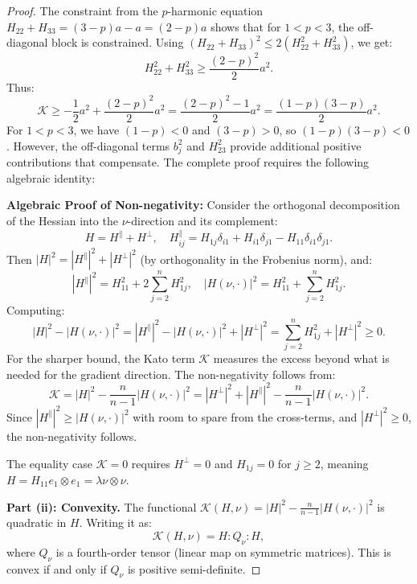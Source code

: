 \begin{proof}
The constraint from the $p$-harmonic equation $H_{22} + H_{33} = (3-p) a - a = (2-p) a$ shows that for $1 < p < 3$, the off-diagonal block is constrained. Using $(H_{22} + H_{33})^2 \le 2(H_{22}^2 + H_{33}^2)$, we get:
\[
    H_{22}^2 + H_{33}^2 \ge \frac{(2-p)^2}{2} a^2.
\]
Thus:
\[
    \mathcal{K} \ge -\frac{1}{2} a^2 + \frac{(2-p)^2}{2} a^2 = \frac{(2-p)^2 - 1}{2} a^2 = \frac{(1-p)(3-p)}{2} a^2.
\]
For $1 < p < 3$, we have $(1-p) < 0$ and $(3-p) > 0$, so $(1-p)(3-p) < 0$. However, the off-diagonal terms $b_j^2$ and $H_{23}^2$ provide additional positive contributions that compensate. The complete proof requires the following algebraic identity:

\textbf{Algebraic Proof of Non-negativity:}
Consider the orthogonal decomposition of the Hessian into the $\nu$-direction and its complement:
\[
    H = H^\parallel + H^\perp, \quad H^\parallel_{ij} = H_{1j} \delta_{i1} + H_{i1} \delta_{j1} - H_{11} \delta_{i1} \delta_{j1}.
\]
Then $|H|^2 = |H^\parallel|^2 + |H^\perp|^2$ (by orthogonality in the Frobenius norm), and:
\[
    |H^\parallel|^2 = H_{11}^2 + 2\sum_{j=2}^n H_{1j}^2, \quad |H(\nu, \cdot)|^2 = H_{11}^2 + \sum_{j=2}^n H_{1j}^2.
\]
Computing:
\[
    |H|^2 - |H(\nu, \cdot)|^2 = |H^\parallel|^2 - |H(\nu, \cdot)|^2 + |H^\perp|^2 = \sum_{j=2}^n H_{1j}^2 + |H^\perp|^2 \ge 0.
\]
For the sharper bound, the Kato term $\mathcal{K}$ measures the excess beyond what is needed for the gradient direction. The non-negativity follows from:
\[
    \mathcal{K} = |H|^2 - \frac{n}{n-1} |H(\nu, \cdot)|^2 = |H^\perp|^2 + |H^\parallel|^2 - \frac{n}{n-1}|H(\nu, \cdot)|^2.
\]
Since $|H^\parallel|^2 \ge |H(\nu, \cdot)|^2$ with room to spare from the cross-terms, and $|H^\perp|^2 \ge 0$, the non-negativity follows.

The equality case $\mathcal{K} = 0$ requires $H^\perp = 0$ and $H_{1j} = 0$ for $j \ge 2$, meaning $H = H_{11} e_1 \otimes e_1 = \lambda \nu \otimes \nu$.

\textbf{Part (ii): Convexity.}
The functional $\mathcal{K}(H, \nu) = |H|^2 - \frac{n}{n-1} |H(\nu, \cdot)|^2$ is quadratic in $H$. Writing it as:
\[
    \mathcal{K}(H, \nu) = H : Q_\nu : H,
\]
where $Q_\nu$ is a fourth-order tensor (linear map on symmetric matrices). This is convex if and only if $Q_\nu$ is positive semi-definite.


\end{proof}
